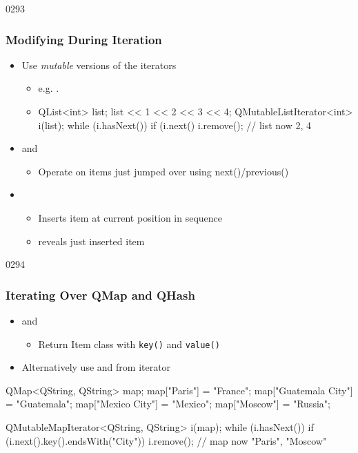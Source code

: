 \begin{slide}[fragile]{0293}\frametitle{Modifying During Iteration}
\begin{itemize}
  \item Use \emph{mutable} versions of the iterators
  \begin{itemize}
	  \item e.g. .
    \item[] \begin{cpp}
QList<int> list; 
list << 1 << 2 << 3 << 4;
QMutableListIterator<int> i(list);
while (i.hasNext()) {
  if (i.next() %
    i.remove();
}
// list now 2, 4  
    \end{cpp}
  \end{itemize}
  \item {} and 
  \begin{itemize}
    \item  Operate on items just jumped over using next()/previous()
  \end{itemize}
  \item {} 
  \begin{itemize}
    \item Inserts item at current position in sequence \\ 
    \item {} reveals just inserted item
  \end{itemize}
\end{itemize}    
\end{slide}

\begin{slide}[fragile]{0294}\frametitle{Iterating Over QMap and QHash}
\begin{itemize}
\item {} and  
  \begin{itemize}  
  	\item Return Item class  with \texttt{key()} and \texttt{value()}
  \end{itemize}  
\item Alternatively use  and  from iterator
\end{itemize} 
\begin{cpp}
QMap<QString, QString> map;
map["Paris"] = "France";
map["Guatemala City"] = "Guatemala";
map["Mexico City"] = "Mexico";
map["Moscow"] = "Russia";

QMutableMapIterator<QString, QString> i(map);
while (i.hasNext()) {
  if (i.next().key().endsWith("City"))
    i.remove();
}          
// map now "Paris", "Moscow"
\end{cpp}
\end{slide}

